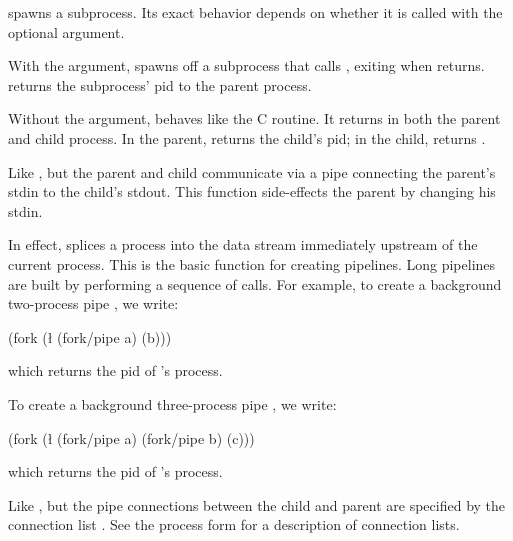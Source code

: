 \begin{protos}
     spawns a {\Unix} subprocess.
    Its exact behavior depends on whether it is called with the optional
     argument.

    With the  argument,  spawns off a subprocess that
    calls , exiting when  returns. 
     returns the subprocess' pid to the parent process.

    Without the  argument,  behaves like the C 
    routine.
    It returns in both the parent and child process. 
    In the parent,  returns the child's pid;
    in the child,  returns .

    Like , but the parent and child communicate via a pipe 
    connecting the parent's stdin to the child's stdout. This function 
    side-effects the parent by changing his stdin.

    In effect,  splices a process into the data stream
    immediately upstream of the current process.
    This is the basic function for creating pipelines.
    Long pipelines are built by performing a sequence of  calls.
\pagebreak
    For example, to create a background two-process pipe , we write:
%
\begin{tightcode}
(fork (\l{} (fork/pipe a) (b)))\end{tightcode}
%
    which returns the pid of 's process.

    To create a background three-process pipe , we write:
%
\begin{code}
(fork (\l{} (fork/pipe a)
            (fork/pipe b)
            (c)))\end{code}
%    
    which returns the pid of 's process.


    Like , but the pipe connections between the child and parent
    are specified by the connection list . 
    See the 
    process form for a description of connection lists.
\end{protos}

